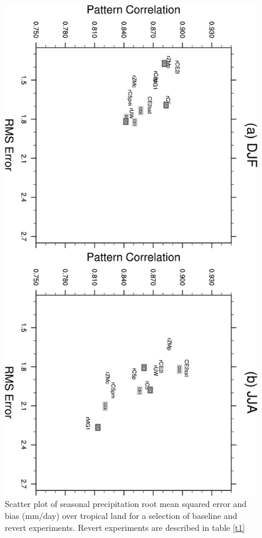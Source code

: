 \clearpage
\begin{figure}[t]
  \begin{center}
    \includegraphics[width=0.5
    \textwidth,angle=90.]{./figs/f_scatt_tropics_PRECT_ocean.pdf}
  \end{center}
  \caption{Scatter plot of seasonal precipitation root mean squared error and bias (mm/day) over tropical land for a selection of baseline and revert experiments. Revert experiments are described in table \ref{t1}} 
\label{f_scatt_tropics_PRECT_ocean}
\end{figure} 

